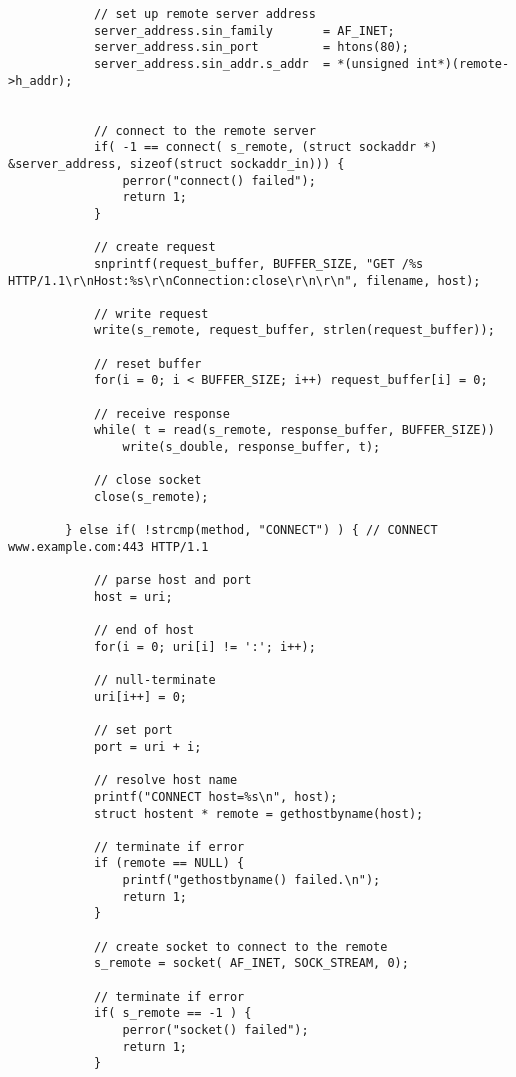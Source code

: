 \begin{lstlisting}
            // set up remote server address
            server_address.sin_family       = AF_INET;
            server_address.sin_port         = htons(80);
            server_address.sin_addr.s_addr  = *(unsigned int*)(remote->h_addr);


            // connect to the remote server
            if( -1 == connect( s_remote, (struct sockaddr *) &server_address, sizeof(struct sockaddr_in))) {
                perror("connect() failed");
                return 1;
            }

            // create request
            snprintf(request_buffer, BUFFER_SIZE, "GET /%s HTTP/1.1\r\nHost:%s\r\nConnection:close\r\n\r\n", filename, host);

            // write request
            write(s_remote, request_buffer, strlen(request_buffer));

            // reset buffer
            for(i = 0; i < BUFFER_SIZE; i++) request_buffer[i] = 0;

            // receive response
            while( t = read(s_remote, response_buffer, BUFFER_SIZE))
                write(s_double, response_buffer, t);

            // close socket
            close(s_remote);

        } else if( !strcmp(method, "CONNECT") ) { // CONNECT www.example.com:443 HTTP/1.1
            
            // parse host and port
            host = uri;

            // end of host
            for(i = 0; uri[i] != ':'; i++);

            // null-terminate
            uri[i++] = 0;

            // set port
            port = uri + i;

            // resolve host name
            printf("CONNECT host=%s\n", host);
            struct hostent * remote = gethostbyname(host);

            // terminate if error
            if (remote == NULL) {
                printf("gethostbyname() failed.\n");
                return 1;
            }

            // create socket to connect to the remote
            s_remote = socket( AF_INET, SOCK_STREAM, 0);

            // terminate if error
            if( s_remote == -1 ) {
                perror("socket() failed");
                return 1;
            }
            

\end{lstlisting}

